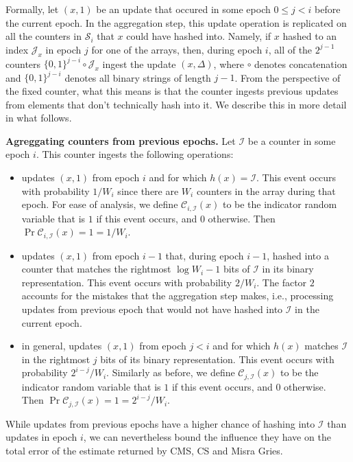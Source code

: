 \documentclass[sigconf]{acmart}
\begin{document}
Formally, let $(x,1)$ be an update that occured in some epoch $0\leq j < i$ before the current epoch. In the aggregation step, this update operation is replicated on all the counters in $\mathcal{S}_i$ that $x$ could have hashed into. Namely, if $x$ hashed to an index $\mathcal{J}_x$ in epoch $j$ for one of the arrays, then, during epoch $i$, all of the $2^{j-1}$ counters $\{0,1\}^{j-i} \circ \mathcal{J}_x$ ingest the update $(x,\Delta)$, where $\circ$ denotes concatenation and $ \{0,1\}^{j-i}$ denotes all binary strings of length $j-1$. From the perspective of the fixed counter, what this means is that the counter ingests previous updates from elements that don't technically hash into it. We describe this in more detail in what follows.

\medskip\noindent
\textbf{Agreggating counters from previous epochs.} Let $\mathcal{I}$ be a counter in some epoch $i$. This counter ingests the following operations:

\begin{itemize}
\item updates $(x,1)$ from epoch $i$ and for which $h(x) = \mathcal{I}$. This event occurs with probability $1/W_i$ since there are $W_i$ counters in the array during that epoch. For ease of analysis, we define $\mathcal{C}_{i,\mathcal{I}}(x)$ to be the indicator random variable that is $1$ if this event occurs, and $0$ otherwise. Then $\Pr{\mathcal{C}_{i,\mathcal{I}}(x) =1}= 1/W_i$.
\item updates $(x,1)$ from epoch $i-1$ that, during epoch $i-1$, hashed into a counter that matches the rightmost $\log W_i - 1$ bits of $\mathcal{I}$ in its binary representation. This event occurs with probability $2/W_i$. The factor $2$ accounts for the mistakes that the aggregation step makes, i.e., processing updates from previous epoch that would not have hashed into $\mathcal{I}$ in the current epoch.
\item  in general, updates $(x,1)$ from epoch $j <i $ and for which $h(x)$ matches $\mathcal{I}$ in the rightmost $j$ bits of its binary representation. This event occurs with probability $2^{i-j}/W_i$. Similarly as before, we define $\mathcal{C}_{j,\mathcal{I}}(x)$ to be the indicator random variable that is $1$ if this event occurs, and $0$ otherwise. Then  $\Pr{\mathcal{C}_{j,\mathcal{I}}(x) =1}=  2^{i-j}/W_i$.
\end{itemize}

While updates from previous epochs have a higher chance of hashing into $\mathcal{I}$ than updates in epoch $i$, we can nevertheless bound the influence they have on the total error of the estimate returned by CMS, CS and Misra Gries.
\end{document}
